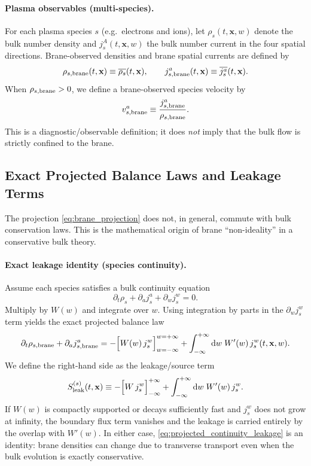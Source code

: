 \documentclass[11pt]{article}
\newcommand{\x}{\mathbf{x}}     %
\newcommand{\W}{W}              %
\newcommand{\Proj}[1]{\overline{#1}} %
\newcommand{\Sleak}{S_{\rm leak}}
\begin{document}
\paragraph{Plasma observables (multi-species).}
For each plasma species \(s\) (e.g.\ electrons and ions), let \(\rho_s(t,\x,w)\)
denote the bulk number density and \(j_s^A(t,\x,w)\) the bulk number current in
the four spatial directions. Brane-observed densities and brane spatial currents
are defined by
\begin{equation}
\rho_{s,\rm brane}(t,\x)\equiv \Proj{\rho_s}(t,\x),
\qquad
j_{s,\rm brane}^a(t,\x)\equiv \Proj{j_s^a}(t,\x).
\label{eq:brane_species_defs}
\end{equation}
When \(\rho_{s,\rm brane}>0\), we define a brane-observed species velocity by
\begin{equation}
v_{s,\rm brane}^a \equiv \frac{j_{s,\rm brane}^a}{\rho_{s,\rm brane}}.
\label{eq:brane_velocity_def}
\end{equation}
This is a diagnostic/observable definition; it does \emph{not} imply that the bulk
flow is strictly confined to the brane.

\subsection{Exact Projected Balance Laws and Leakage Terms}
\label{sec:leakage_identity}

The projection \eqref{eq:brane_projection} does not, in general, commute with bulk
conservation laws. This is the mathematical origin of brane ``non-ideality'' in a
conservative bulk theory.

\paragraph{Exact leakage identity (species continuity).}
Assume each species satisfies a bulk continuity equation
\begin{equation}
\partial_t\rho_s + \partial_a j_s^a + \partial_w j_s^w = 0.
\label{eq:bulk_continuity_species_leakage}
\end{equation}
Multiply by \(\W(w)\) and integrate over \(w\). Using integration by parts in the
\(\partial_w j_s^w\) term yields the exact projected balance law
\begin{equation}
\partial_t \rho_{s,\rm brane} + \partial_a j_{s,\rm brane}^a
=
-\Big[\W(w)\,j_s^w\Big]_{w=-\infty}^{w=+\infty}
+\int_{-\infty}^{+\infty}\dd w\;\W'(w)\,j_s^w(t,\x,w).
\label{eq:projected_continuity_leakage}
\end{equation}
We define the right-hand side as the leakage/source term
\begin{equation}
\Sleak^{(s)}(t,\x)
\equiv
-\Big[\W\,j_s^w\Big]_{-\infty}^{+\infty}
+\int_{-\infty}^{+\infty}\dd w\;\W'(w)\,j_s^w.
\label{eq:Sleak_def}
\end{equation}
If \(\W(w)\) is compactly supported or decays sufficiently fast and \(j_s^w\) does
not grow at infinity, the boundary flux term vanishes and the leakage is carried
entirely by the overlap with \(\W'(w)\). In either case, \eqref{eq:projected_continuity_leakage}
is an identity: brane densities can change due to transverse transport even when
the bulk evolution is exactly conservative.
\end{document}
